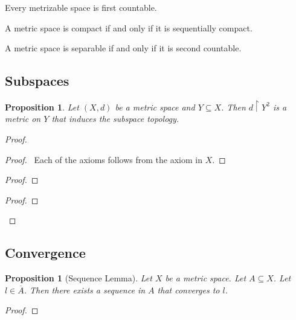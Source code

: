 \documentclass{book}
\let\qed\relax
\newtheorem{prop}[ax]{Proposition}
\theoremstyle{definition}
\begin{document}
Every metrizable space is first countable.

A metric space is compact if and only if it is sequentially compact.

A metric space is separable if and only if it is second countable.

\subsection{Subspaces}

\begin{prop}
Let $(X,d)$ be a metric space and $Y \subseteq X$. Then $d \restriction Y^2$ is a metric on $Y$ that induces the subspace topology.
\end{prop}

\begin{proof}
\pf
{}
\begin{proof}
	\pf\ Each of the axioms follows from the axiom in $X$.
\end{proof}
\begin{proof}
\end{proof}
\begin{proof}
\end{proof}
\qed
\end{proof}

\subsection{Convergence}

\begin{prop}[Sequence Lemma]
Let $X$ be a metric space. Let $A \subseteq X$. Let $l \in \overline{A}$. Then there exists a sequence in $A$ that converges to $l$.
\end{prop}

\begin{proof}
\pf
{}
\qed
\end{proof}
\end{document}
